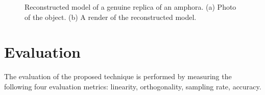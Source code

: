 \documentclass[final,12pt,3p]{elsarticle}
\begin{document}
\begin{figure}[!ht]
	\caption{\label{fig:amphora} Reconstructed model of a genuine replica of an amphora. (a) Photo of the object. (b) A render of the reconstructed model.}
\end{figure}

\section{Evaluation}
\label{sec:evaluation}
The evaluation of the proposed technique is performed by measuring the following four evaluation metrics: linearity, orthogonality, sampling rate, accuracy.
\end{document}
